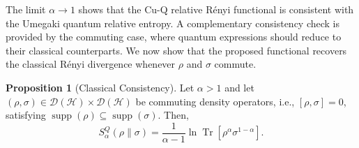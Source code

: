 \documentclass[a4paper, amsfonts, amssymb, amsmath, reprint, showkeys, nofootinbib, twoside, aps, pra]{revtex4-2}
\theoremstyle{definition}
\newtheorem{proposition}[theorem]{Proposition}
\begin{document}
The limit $\alpha\to1$ shows that the Cu-Q relative Rényi functional is consistent with the Umegaki quantum relative entropy. A complementary consistency check is provided by the commuting case, where quantum
expressions should reduce to their classical counterparts. We now show that the proposed functional recovers the classical Rényi divergence
whenever $\rho$ and $\sigma$ commute.

\begin{proposition}[Classical Consistency]
Let $\alpha >1$ and let
$(\rho,\sigma) \in \mathcal{D}(\mathcal{H}) \times \mathcal{D}(\mathcal{H})$
be commuting density operators, i.e., $[\rho,\sigma]=0$, satisfying
$\operatorname{supp}(\rho)\subseteq\operatorname{supp}(\sigma)$.
Then,
\begin{equation}\label{eq:classical-reduction}
S^Q_\alpha(\rho\|\sigma) =
\frac{1}{\alpha-1}\ln\operatorname{Tr}\!\left[
\rho^\alpha \sigma^{1-\alpha}
\right].
\end{equation}
\end{proposition}
\end{document}
